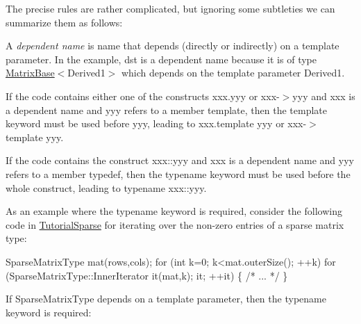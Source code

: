 The precise rules are rather complicated, but ignoring some subtleties we can summarize them as follows\+:
\begin{DoxyItemize}
\item A {\itshape dependent name} is name that depends (directly or indirectly) on a template parameter. In the example, {\ttfamily dst} is a dependent name because it is of type {\ttfamily \hyperlink{group___core___module_class_eigen_1_1_matrix_base}{Matrix\+Base}$<$Derived1$>$} which depends on the template parameter {\ttfamily Derived1}.
\item If the code contains either one of the constructs {\ttfamily xxx.\+yyy} or {\ttfamily xxx-\/$>$yyy} and {\ttfamily xxx} is a dependent name and {\ttfamily yyy} refers to a member template, then the {\ttfamily template} keyword must be used before {\ttfamily yyy}, leading to {\ttfamily xxx.\+template yyy} or {\ttfamily xxx-\/$>$template yyy}.
\item If the code contains the construct {\ttfamily xxx\+::yyy} and {\ttfamily xxx} is a dependent name and {\ttfamily yyy} refers to a member typedef, then the {\ttfamily typename} keyword must be used before the whole construct, leading to {\ttfamily typename xxx\+::yyy}.
\end{DoxyItemize}

As an example where the {\ttfamily typename} keyword is required, consider the following code in \hyperlink{group___tutorial_sparse}{Tutorial\+Sparse} for iterating over the non-\/zero entries of a sparse matrix type\+:


\begin{DoxyCode}
SparseMatrixType mat(rows,cols);
\textcolor{keywordflow}{for} (\textcolor{keywordtype}{int} k=0; k<mat.outerSize(); ++k)
  \textcolor{keywordflow}{for} (SparseMatrixType::InnerIterator it(mat,k); it; ++it)
  \{
    \textcolor{comment}{/* ... */}
  \}
\end{DoxyCode}


If {\ttfamily Sparse\+Matrix\+Type} depends on a template parameter, then the {\ttfamily typename} keyword is required\+:


